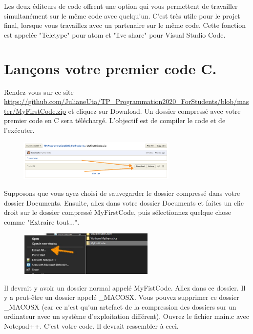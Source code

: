 \documentclass{article}
\begin{document}
Les deux éditeurs de code offrent une option qui vous permettent de travailler simultanément sur le même code avec quelqu'un. C'est très utile pour le projet final, lorsque vous travaillez avec un partenaire sur le même code. Cette fonction est appelée "Teletype" pour atom et "live share" pour Visual Studio Code.

\section{Lançons votre premier code C.}
Rendez-vous sur ce site \href{https://github.com/JulianeUta/TP_Programmation2020_ForStudents/blob/master/MyFirstCode.zip}{https://github.com/JulianeUta/TP\_Programmation2020\_ForStudents/blob/master/MyFirstCode.zip} et cliquez sur Download. Un dossier compressé avec votre premier code en C sera téléchargé. L'objectif est de compiler le code et de l'exécuter.
\begin{figure}[H]
\center
\includegraphics[width=0.7\textwidth]{Plots/FirstCode_1.png}
\end{figure}
Supposons que vous ayez choisi de sauvegarder le dossier compressé dans votre dossier Documents. Ensuite, allez dans votre dossier Documents et faites un clic droit sur le dossier compressé MyFirstCode, puis sélectionnez quelque chose comme "Extraire tout...".
\begin{figure}[H]
\center
\includegraphics[width=0.6\textwidth]{Plots/FirstCode_2.jpg}
\end{figure}
Il devrait y avoir un dossier normal appelé MyFistCode. Allez dans ce dossier. Il y a peut-être un dossier appelé \_MACOSX.  Vous pouvez supprimer ce dossier \_MACOSX (car ce n'est qu'un artefact de la compression des dossiers sur un ordinateur avec un système d'exploitation différent). Ouvrez le fichier main.c avec Notepad++. C'est votre code. Il devrait ressembler à ceci. 
\end{document}
